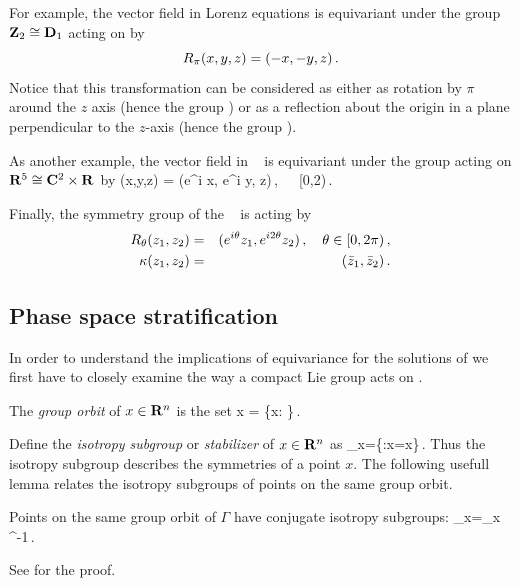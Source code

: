 For example, the vector field in Lorenz equations   is equivariant under the group
$\mathbf{Z}_2\cong\mathbf{D}_1$ acting on  by
\[
	R_{\pi}(x,y,z) = (-x,-y,z)\,.
\]
Notice that this transformation can be considered as either as rotation by $\pi$ around the $z$ axis (hence the
group ) or as a reflection about the origin in a plane perpendicular to the $z$-axis (hence the group ).

As another example, the vector field in \CLe~  is equivariant under the group  acting on $\mathbf{R}^{5}\cong \mathbf{C}^{2}\times \mathbf{R}^{}$
by
\beq
 \Rot{\theta} (x,y,z) = (e^{i\theta} x, e^{i\theta} y, z)\,,\ \ \  \theta\in[0,2\pi)\,.
 \label{eq:RotCLe}
\eeq

Finally, the symmetry group of the \AGHe~ is  acting by
\begin{eqnarray*}
  R_{\theta}(z_1,z_2) &=& (e^{i\theta} z_1, e^{i 2\theta} z_2)\,,\ \ \  \theta\in[0,2\pi)\,,\\
  \kappa(z_1,z_2) &=& (\bar{z}_1,\bar{z}_2)\,.
\end{eqnarray*}


\subsection{Phase space stratification}

In order to understand the implications of equivariance for the solutions
of  we first have to closely examine the way a compact 
Lie group acts on .

 The \emph{group orbit} of $x\in\mathbf{R}^{n}$ is the set
\beq
	\Gamma x = \{\gamma x: \gamma\in\Gamma\}\,.
\eeq

 Define the \emph{isotropy subgroup} or \emph{stabilizer} of $x\in\mathbf{R}^{n}$ as
\beq
	\Sigma_x=\{\gamma\in\Gamma:\gamma x=x\}\,.
\eeq
Thus the isotropy subgroup describes the symmetries of a point $x$. The following usefull lemma
relates the isotropy subgroups of points on the same group orbit.

\begin{lemma}
\label{lm:stabGorbit}
Points on the same group orbit of $\Gamma$ have conjugate isotropy subgroups:
\beq
	\Sigma_{\gamma x}=\gamma \Sigma_x \gamma^{-1}\,.
\eeq
\end{lemma}
See  for the proof.

